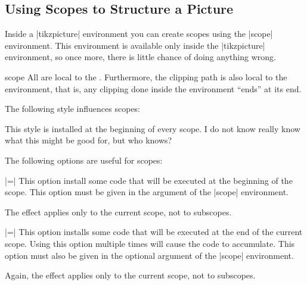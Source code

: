 \subsection{Using Scopes to Structure a Picture}

Inside a |{tikzpicture}| environment you can create scopes
using the |{scope}| environment. This environment is available only
inside the |{tikzpicture}| environment, so once more, there is little
chance of doing anything wrong.

\begin{environment}{{scope}}
  All  are local to the . Furthermore, the clipping path is also local to the
  environment, that is, any clipping done inside the environment
  ``ends'' at its end.

\begin{codeexample}[]
\begin{tikzpicture}
  \begin{scope}[red]
    \draw (0mm,0mm) -- (10mm,0mm);
    \draw (0mm,1mm) -- (10mm,1mm);
  \end{scope}
  \draw (0mm,2mm) -- (10mm,2mm);
  \begin{scope}[green]
    \draw (0mm,3mm) -- (10mm,3mm);
    \draw (0mm,4mm) -- (10mm,4mm);
    \draw[blue] (0mm,5mm) -- (10mm,5mm);
  \end{scope}
\end{tikzpicture}
\end{codeexample}
  
  The following style influences scopes:
  \begin{itemize}
    This style is installed at the beginning of every scope. I do not
    know really know what this might be good for, but who knows?
  \end{itemize}

  The following options are useful for scopes:
  \begin{itemize}
    |=|
    This option install some code that will be executed
    at the beginning of the scope. This option must be
    given in the argument of the |{scope}| environment.

    The effect applies only to the current scope, not to subscopes.

    |=|
    This option installs some code that will be executed
    at the end of the  current scope. Using this option multiple times
    will  cause the code to accumulate. This option must also be given
    in the optional argument of the |{scope}| environment. 

    Again, the effect applies only to the current scope, not to subscopes.
  \end{itemize}
\end{environment}


